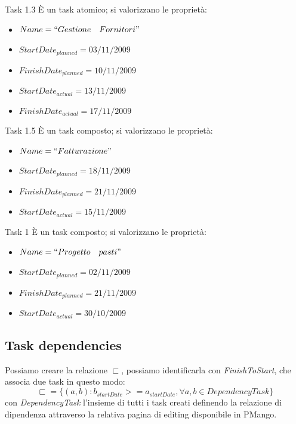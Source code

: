 \begin{taksDef}{Task 1.3} \`E un task atomico; si valorizzano le propriet\`a:
\begin{itemize}
  \item $Name = ``Gestione\quad Fornitori"$
  \item $StartDate_{planned} = 03/11/2009$
  \item $FinishDate_{planned} = 10/11/2009$
  \item $StartDate_{actual} = 13/11/2009$
  \item $FinishDate_{actual} = 17/11/2009$
\end{itemize}
\end{taksDef}

\begin{taksDef}{Task 1.5} \`E un task composto; si valorizzano le
propriet\`a:
\begin{itemize}
  \item $Name = ``Fatturazione"$
  \item $StartDate_{planned} = 18/11/2009$
  \item $FinishDate_{planned} = 21/11/2009$
  \item $StartDate_{actual} = 15/11/2009$
\end{itemize}
\end{taksDef}

\begin{taksDef}{Task 1} \`E un task composto; si valorizzano le propriet\`a:
\begin{itemize}
  \item $Name = ``Progetto\quad pasti"$
  \item $StartDate_{planned} = 02/11/2009$
  \item $FinishDate_{planned} = 21/11/2009$
  \item $StartDate_{actual} = 30/10/2009$
\end{itemize}
\end{taksDef}

\subsection{Task dependencies}
Possiamo creare la relazione $\sqsubset$, possiamo identificarla con
\emph{FinishToStart}, che associa due task in questo modo:
\begin{displaymath}
\sqsubset = \lbrace (a,b) : b_{startDate} >= a_{startDate}, \forall a,b \in
DependencyTask
\rbrace
\end{displaymath}
con \emph{DependencyTask} l'insieme di tutti i task creati definendo la
relazione di dipendenza attraverso la relativa pagina di editing disponibile in
PMango. 

